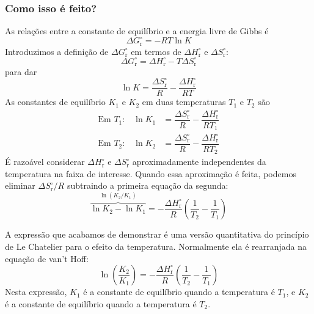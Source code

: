 \begin{derivation}

\subsubsection{Como isso é feito?}

As relações entre a constante de equilíbrio e a energia livre de Gibbs é \[
    \Delta G_\mathrm{r}^\circ = -RT \ln K
\] Introduzimos a definição de \(\Delta G_\mathrm{r}^\circ\) em termos de \(\Delta H_\mathrm{r}^\circ\) e \(\Delta S_\mathrm{r}^\circ\): \[
    \Delta G_\mathrm{r}^\circ = \Delta H_\mathrm{r}^\circ - T \Delta S_\mathrm{r}^\circ
\] para dar \[
    \ln K = \dfrac{ \Delta S_\mathrm{r}^\circ }{ R } 
          - \dfrac{ \Delta H_\mathrm{r}^\circ }{ R T } 
\] As constantes de equilíbrio \(K_1\) e \(K_2\) em duas temperaturas \(T_1\) e \(T_2\) são \[
\begin{aligned}
    \text{Em $T_1$:} \quad \ln K_1 
        &= \dfrac{ \Delta S_\mathrm{r}^\circ }{ R } 
         - \dfrac{ \Delta H_\mathrm{r}^\circ }{ R T_1 } \\
    \text{Em $T_2$:} \quad \ln K_2 
        &= \dfrac{ \Delta S_\mathrm{r}^\circ }{ R } 
         - \dfrac{ \Delta H_\mathrm{r}^\circ }{ R T_2 }
\end{aligned}
\] É razoável considerar \(\Delta H_\mathrm{r}^\circ\) e \(\Delta S_\mathrm{r}^\circ\) aproximadamente independentes da temperatura na faixa de
interesse. Quando essa aproximação é feita, podemos eliminar \(\Delta S_\mathrm{r}^\circ/R\) subtraindo a primeira equação da segunda: \[
    \overbrace{ \ln K_2 - \ln K_1 }^{ \ln (K_2/K_1) } 
        = -\dfrac{ \Delta H^\circ_\mathrm{r} }{ R } 
            \left( \dfrac{1}{T_2} - \dfrac{1}{T_1} \right)
\]

\end{derivation}

A expressão que acabamos de demonstrar é uma versão quantitativa do princípio de Le Chatelier para o efeito da temperatura. Normalmente ela é
rearranjada na equação de van't Hoff: \[
    \ln \left( \dfrac{K_2}{K_1} \right)
        = -\dfrac{ \Delta H^\circ_\mathrm{r} }{ R } 
            \left( \dfrac{1}{T_2} - \dfrac{1}{T_1} \right)
\tag{11}
\] Nesta expressão, \(K_1\) é a constante de equilíbrio quando a temperatura é \(T_1\), e \(K_2\) é a constante de equilíbrio quando a temperatura é
\(T_2\).

